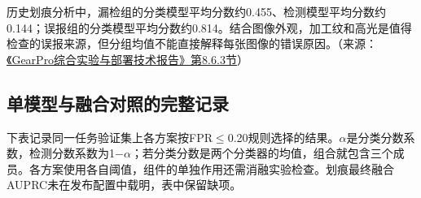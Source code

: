 历史划痕分析中，漏检组的分类模型平均分数约0.455、检测模型平均分数约0.144；误报组的分类模型平均分数约0.814。结合图像外观，加工纹和高光是值得检查的误报来源，但分组均值不能直接解释每张图像的错误原因。（来源：\protect\href{run:../GearPro_综合技术报告_Markdown含配图/GearPro_综合实验与部署技术报告.md}{《GearPro综合实验与部署技术报告》第8.6.3节}）

\FloatBarrier{}\subsection{单模型与融合对照的完整记录}
下表记录同一任务验证集上各方案按FPR\ensuremath{\leq}0.20规则选择的结果。\ensuremath{\alpha}是分类分数系数，检测分数系数为1\ensuremath{-}\ensuremath{\alpha}；若分类分数是两个分类器的均值，组合就包含三个成员。各方案使用各自阈值，组件的单独作用还需消融实验检查。划痕最终融合AUPRC未在发布配置中载明，表中保留缺项。


